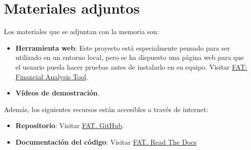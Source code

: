 \section{Materiales adjuntos}\label{materiales-adjuntos}

Los materiales que se adjuntan con la memoria son: 

\begin{itemize}
\item
	\textbf{Herramienta web}:
	Este proyecto está especialmente pensado para ser utilizado en un entorno local, pero se ha dispuesto una página web para que el usuario pueda hacer pruebas antes de instalarlo en su equipo. Visitar \href{http://takeiteasy.pythonanywhere.com/}{FAT: Financial Analysis Tool}.
\item	
	\textbf{Vídeos de demostración}.
\end{itemize}

Además, los siguientes recursos están accesibles a través de internet:

\begin{itemize}
\item
  \textbf{Repositorio}: 
  Visitar \href{https://github.com/rmt0009alu/FAT}{FAT. GitHub}.
\item
  \textbf{Documentación del código}: 
  Visitar \href{https://fat.readthedocs.io/es/latest/intro.html#}{FAT. Read The Docs} 
\end{itemize}


